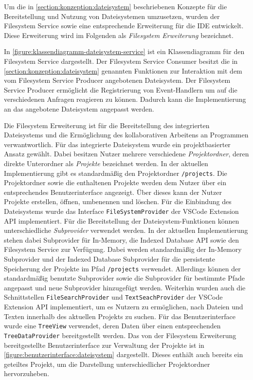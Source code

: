 Um die in \autoref{section:konzeption:dateisystem} beschriebenen Konzepte für die Bereitstellung und Nutzung von Dateisystemen umzusetzen, wurden der Filesystem Service sowie eine entsprechende Erweiterung für die IDE entwickelt. Diese Erweiterung wird im Folgenden als \textit{Filesystem Erweiterung} bezeichnet.

In \autoref{figure:klassendiagramm-dateisystem-service} ist ein Klassendiagramm für den Filesystem Service dargestellt. Der Filesystem Service Consumer besitzt die in \autoref{section:konzeption:dateisystem} genannten Funktionen zur Interaktion mit dem vom Filesystem Service Producer angebotenen Dateisystem. Der Filesystem Service Producer ermöglicht die Registrierung von Event-Handlern um auf die verschiedenen Anfragen reagieren zu können. Dadurch kann die Implementierung an das angebotene Dateisystem angepasst werden.

Die Filesystem Erweiterung ist für die Bereitstellung des integrierten Dateisystems und die Ermöglichung des kollaborativen Arbeitens an Programmen verwantwortlich. Für das integrierte Dateisystem wurde ein projektbasierter Ansatz gewählt. Dabei besitzen Nutzer mehrere verschiedene \textit{Projektordner}, deren direkte Unterordner als \textit{Projekte} bezeichnet werden. In der aktuellen Implementierung gibt es standardmäßig den Projektordner \texttt{/projects}. Die Projektordner sowie die enthaltenen Projekte werden dem Nutzer über ein entsprechendes Benutzerinterface angezeigt. Über dieses kann der Nutzer Projekte erstellen, öffnen, umbenennen und löschen. Für die Einbindung des Dateisystems wurde das Interface \texttt{FileSystemProvider} der VSCode Extension API implementiert. Für die Bereitstellung der Dateisystem-Funktionen können unterschiedliche \textit{Subprovider} verwendet werden. In der aktuellen Implementierung stehen dabei Subprovider für In-Memory, die Indexed Database API sowie den Filesystem Service zur Verfügung. Dabei werden standardmäßig der In-Memory Subprovider und der Indexed Database Subprovider für die persistente Speicherung der Projekte im Pfad \texttt{/projects} verwendet. Allerdings können der standardmäßig benutzte Subprovider sowie die Subprovider für bestimmte Pfade angepasst und neue Subprovider hinzugefügt werden. Weiterhin wurden auch die Schnittstellen \texttt{FileSearchProvider} und \texttt{TextSeachProvider} der VSCode Extension API implementiert, um es Nutzern zu ermöglichen, nach Dateien und Texten innerhalb des aktuellen Projekts zu suchen. Für das Benutzerinterface wurde eine \texttt{TreeView} verwendet, deren Daten über einen entsprechenden \texttt{TreeDataProvider} bereitgestellt werden. Das von der Filesystem Erweiterung bereitgestellte Benutzerinterface zur Verwaltung der Projekte ist in \autoref{figure:benutzerinterface:dateisystem} dargestellt. Dieses enthält auch bereits ein geteiltes Projekt, um die Darstellung unterschiedlicher Projektordner hervorzuheben.

